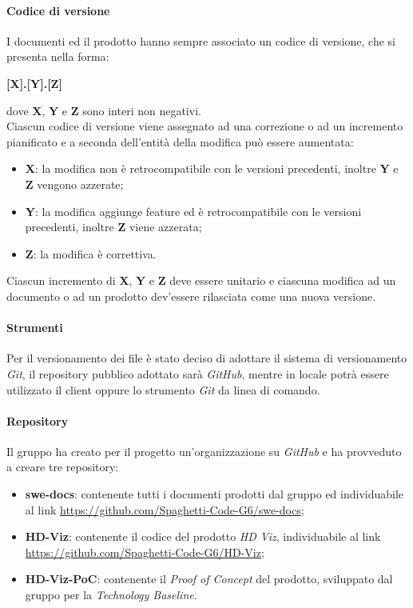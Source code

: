 \paragraph{Codice di versione}
\label{par:codice_versione}

I documenti ed il prodotto hanno sempre associato un codice di versione, che si presenta nella forma:
\begin{center}
    \textbf{[X].[Y].[Z]}
\end{center}
dove \textbf{X}, \textbf{Y} e \textbf{Z} sono interi non negativi.\\
Ciascun codice di versione viene assegnato ad una correzione o ad un incremento pianificato e a seconda dell'entit\`{a} della modifica 
pu\`{o} essere aumentata: 
\begin{itemize}
	\item \textbf{X}: la modifica non è retrocompatibile con le versioni precedenti, inoltre \textbf{Y} e \textbf{Z} vengono azzerate;
	\item \textbf{Y}: la modifica aggiunge feature ed è retrocompatibile con le versioni precedenti, inoltre \textbf{Z} viene azzerata;
	\item \textbf{Z}: la modifica è correttiva.
\end{itemize}
Ciascun incremento di \textbf{X}, \textbf{Y} e \textbf{Z} deve essere unitario e ciascuna modifica ad un documento o ad un prodotto 
dev'essere rilasciata come una nuova versione.

\paragraph{Strumenti}
\label{par:gestione_configurazione:strumenti}

Per il versionamento dei file è stato deciso di adottare il sistema di versionamento \emph{Git}, il repository pubblico adottato sarà 
\emph{GitHub}, mentre in locale potrà essere utilizzato il client  oppure lo strumento \emph{Git} da linea di 
comando.

\paragraph{Repository}
\label{par:repo}

Il gruppo ha creato per il progetto un'organizzazione su \emph{GitHub} e ha provveduto a creare tre repository:
\begin{itemize}
    \item \textbf{swe-docs}: contenente tutti i documenti prodotti dal gruppo ed individuabile al link 
    	\url{https://github.com/Spaghetti-Code-G6/swe-docs};
    \item \textbf{HD-Viz}: contenente il codice del prodotto \emph{HD Viz}, individuabile al link \url{https://github.com/Spaghetti-Code-G6/HD-Viz};
    \item \textbf{HD-Viz-PoC}: contenente il \emph{Proof of Concept} del prodotto, sviluppato dal gruppo per la \emph{Technology Baseline}.
\end{itemize}


